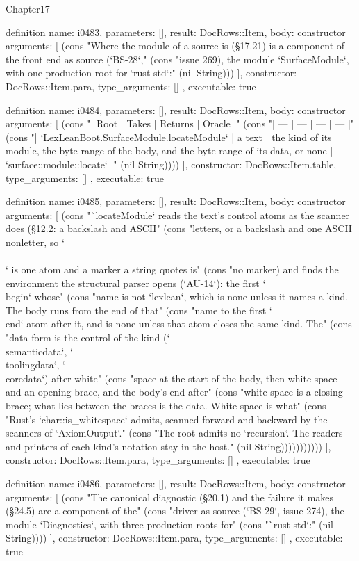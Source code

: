 \begin{lexlean}{Chapter17}
\begin{semanticmodule}
definition{
  name: i0483,
  parameters: [],
  result: DocRows::Item,
  body: constructor{
    arguments: [
      (cons "Where the module of a source is (§17.21) is a component of the front end as source (`BS-28`," (cons "issue 269), the module `SurfaceModule`, with one production root for `rust-std`:" (nil String)))
    ],
    constructor: DocRows::Item.para,
    type_arguments: []
  },
  executable: true
}

definition{
  name: i0484,
  parameters: [],
  result: DocRows::Item,
  body: constructor{
    arguments: [
      (cons "| Root | Takes | Returns | Oracle |" (cons "| --- | --- | --- | --- |" (cons "| `LexLeanBoot.SurfaceModule.locateModule` | a text | the kind of its module, the byte range of the body, and the byte range of its data, or none | `surface::module::locate` |" (nil String))))
    ],
    constructor: DocRows::Item.table,
    type_arguments: []
  },
  executable: true
}

definition{
  name: i0485,
  parameters: [],
  result: DocRows::Item,
  body: constructor{
    arguments: [
      (cons "`locateModule` reads the text's control atoms as the scanner does (§12.2: a backslash and ASCII" (cons "letters, or a backslash and one ASCII nonletter, so `\\\\` is one atom and a marker a string quotes is" (cons "no marker) and finds the environment the structural parser opens (`AU-14`): the first `\\begin` whose" (cons "name is not `lexlean`, which is none unless it names a kind. The body runs from the end of that" (cons "name to the first `\\end` atom after it, and is none unless that atom closes the same kind. The" (cons "data form is the control of the kind (`\\semanticdata`, `\\toolingdata`, `\\coredata`) after white" (cons "space at the start of the body, then white space and an opening brace, and the body's end after" (cons "white space is a closing brace; what lies between the braces is the data. White space is what" (cons "Rust's `char::is_whitespace` admits, scanned forward and backward by the scanners of `AxiomOutput`." (cons "The root admits no `recursion`. The readers and printers of each kind's notation stay in the host." (nil String)))))))))))
    ],
    constructor: DocRows::Item.para,
    type_arguments: []
  },
  executable: true
}

definition{
  name: i0486,
  parameters: [],
  result: DocRows::Item,
  body: constructor{
    arguments: [
      (cons "The canonical diagnostic (§20.1) and the failure it makes (§24.5) are a component of the" (cons "driver as source (`BS-29`, issue 274), the module `Diagnostics`, with three production roots for" (cons "`rust-std`:" (nil String))))
    ],
    constructor: DocRows::Item.para,
    type_arguments: []
  },
  executable: true
}


\end{semanticmodule}
\end{lexlean}
